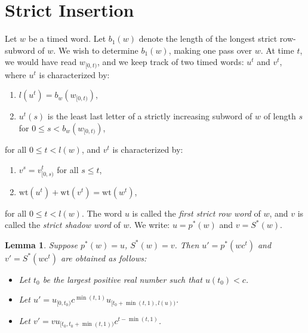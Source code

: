 \documentclass[12pt]{amsart}
\newcommand{\wt}{\mathrm{wt}}
\newtheorem{lemma}[theorem]{Lemma}
\theoremstyle{definition}
\begin{document}
\section{Strict Insertion}
\label{sec:strict-insertion}

Let $w$ be a timed word.
Let $b_1(w)$ denote the length of the longest strict row-subword of $w$.
We wish to determine $b_1(w)$, making one pass over $w$.
At time $t$, we would have read $w_{[0,t)}$, and we keep track of two timed words: $u^t$ and $v^t$, where $u^t$ is characterized by:
\begin{enumerate}
\item $l(u^t) = b_w(w_{[0,t)})$,
\item $u^t(s)$ is the least last letter of a strictly increasing subword of $w$ of length $s$ for $0\leq s<b_w(w_{[0,t)})$,
\end{enumerate}
for all $0\leq t<l(w)$, and $v^t$ is characterized by:
\begin{enumerate}
\item $v^s=v^t_{[0,s)}$ for all $s\leq t$,
\item $\wt(u^t) + \wt(v^t) = \wt(w^t)$,
\end{enumerate}
for all $0\leq t<l(w)$.
The word $u$ is called the \emph{first strict row word} of $w$, and $v$ is called the \emph{strict shadow word} of $w$.
We write: $u=p^*(w)$ and $v=S^*(w)$.
\begin{lemma}
  Suppose $p^*(w)=u$, $S^*(w)=v$.
  Then $u'=p^*(wc^t)$ and $v'=S^*(wc^t)$ are obtained as follows:
  \begin{itemize}
  \item Let $t_0$ be the largest positive real number such that $u(t_0)<c$.
  \item Let $u'=u_{[0,t_0)}c^{\min(t, 1)} u_{[t_0+\min(t,1),l(u))}$.
  \item Let $v'=vu_{[t_0,t_0+\min(t,1))}c^{t-\min(t,1)}$.
  \end{itemize}
\end{lemma}
\end{document}

